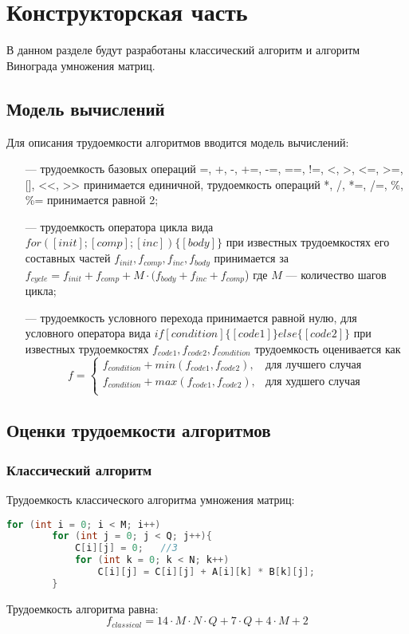 \documentclass{bmstu}
\begin{document}
\chapter{Конструкторская часть}
В данном разделе будут разработаны классический алгоритм и алгоритм Винограда умножения матриц.

\section{Модель вычислений}
Для описания трудоемкости алгоритмов вводится модель вычислений:
\begin{itemize}
	\item[---] трудоемкость базовых операций =, +, -, +=, -=, ==, !=, <, >, <=, >=, [], <<, >> принимается единичной, трудоемкость операций *, /, *=, /=, \%, \%= принимается равной 2;
	\item[---] трудоемкость оператора цикла вида $for([init];[comp];[inc])\{[body]\}$ при известных трудоемкостях его составных частей $f_{init}, f_{comp}, f_{inc}, f_{body}$ принимается за $f_{cycle} = f_{init} + f_{comp} + M \cdot (f_{body} + f_{inc} + f_{comp}$) где $M$ --- количество шагов цикла;
        \item[---] трудоемкость условного перехода принимается равной нулю, для условного оператора вида $if [condition]
            \{[code1]\}
            else
            \{[code2]\}$
        при известных трудоемкостях $f_{code1}, f_{code2}, f_{condition}$ трудоемкость оценивается как
        \begin{equation}
            f = \begin{cases}
    	f_{condition} + min(f_{code1}, f_{code2}), &\text{для лучшего случая}\\
    	f_{condition} + max(f_{code1}, f_{code2}), &\text{для худшего случая}\\
    	\end{cases}
        \end{equation}
\end{itemize}
\newpage
\section{Оценки трудоемкости алгоритмов}
\subsection{Классический алгоритм}
Трудоемкость классического алгоритма умножения матриц:
\begin{center}
\captionsetup{justification=raggedright,singlelinecheck=off}
\begin{lstlisting}[label=lst:alg_cls, language=c, numbers=none, caption=Классический алгоритм умножения матриц]
for (int i = 0; i < M; i++)
        for (int j = 0; j < Q; j++){
            C[i][j] = 0;   //3
            for (int k = 0; k < N; k++)
                C[i][j] = C[i][j] + A[i][k] * B[k][j];
        }
\end{lstlisting}
\end{center}
Трудоемкость алгоритма равна:
\begin{equation}
    f_{classical} = 14\cdot M\cdot N\cdot Q + 7\cdot Q + 4\cdot M + 2
\end{equation}
\end{document}
